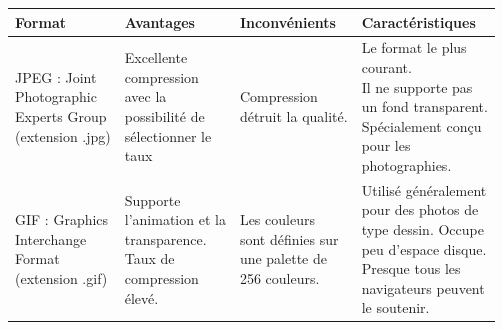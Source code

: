 \begin{table}[H]
	\centering
	\begin{tabular}{|l|l|l|l|}
		
		\hline
		\textbf{Format} & \textbf{Avantages} &
		\textbf{Inconvénients} & \textbf{Caractéristiques} \\
		\hline
		\makecell{JPEG : Joint\\
			Photographic\\
			Experts Group\\
			(extension
			.jpg)}
		& \makecell{Excellente\\
			compression\\
			avec la\\
			possibilité de\\
			sélectionner le\\
			taux} 
		& \makecell{Compression\\
			détruit la qualité.}
		&  \makecell{Le format le plus\\
			courant.\\
			Il ne supporte pas\\
			un fond transparent.\\
			Spécialement conçu\\
			pour les\\
			photographies.}   \\
		\hline
		
		\hline
		\makecell{GIF :
			Graphics\\
			Interchange\\
			Format\\
			(extension .gif)}
		& \makecell{Supporte\\
			l'animation et la\\
			transparence.\\
			Taux de\\
			compression\\
			élevé.} 
		& \makecell{Les couleurs\\
			sont définies sur\\
			une palette de\\
			256 couleurs.}
		&  \makecell{Utilisé généralement\\
			pour des photos de\\
			type dessin. Occupe\\
			peu d'espace disque.\\
			Presque tous les\\
			navigateurs peuvent\\
			le soutenir.}   \\
		\hline
		

\end{tabular}
\end{table}
